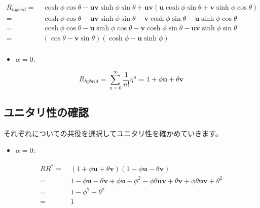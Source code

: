 \documentclass[a4paper,12pt,notitlepage]{jsreport}
\begin{document}
\begin{equation}
  \begin{split}
    R_{hybrid} = ~ & \cosh \phi \cos \theta - \bm{u} \bm{v} \sinh \phi \sin \theta
    + \bm{u} \bm{v} (\bm{u} \cosh \phi \sin \theta + \bm{v} \sinh \phi \cos \theta) \\
    = ~ & \cosh \phi \cos \theta - \bm{u} \bm{v} \sinh \phi \sin \theta
    - \bm{v} \cosh \phi \sin \theta - \bm{u} \sinh \phi \cos \theta \\
    = ~ & \cosh \phi \cos \theta - \bm{u} \sinh \phi \cos \theta 
    - \bm{v} \cosh \phi \sin \theta - \bm{u} \bm{v} \sinh \phi \sin \theta \\
    = ~ & (\cos \theta - \bm{v} \sin \theta)(\cosh \phi - \bm{u} \sinh \phi) \\
  \end{split}
\end{equation}

\begin{itemize}
  \item $ \alpha = 0 : $
\end{itemize}
\begin{equation}
  R_{hybrid} = \sum_{n=0}^{∞} \frac{1}{n!} \eta^n = 1 + \phi \bm{u} + \theta \bm{v}
\end{equation}

\subsection{ユニタリ性の確認}

それぞれについての共役を選択してユニタリ性を確かめていきます。
\begin{itemize}
  \item $ \alpha = 0 : $
\end{itemize}
\begin{equation}
  \begin{split}
    R R^* = ~ & (1 + \phi \bm{u} + \theta \bm{v})(1 - \phi \bm{u} - \theta \bm{v}) \\
    = ~ & 1 - \phi \bm{u} - \theta \bm{v}
    + \phi \bm{u} - \phi^2 - \phi \theta \bm{u} \bm{v}
    + \theta \bm{v} + \phi \theta \bm{u} \bm{v} + \theta^2 \\
    = ~ & 1 - \phi^2 + \theta^2 \\
    = ~ & 1 \\
  \end{split}
\end{equation}
\end{document}
